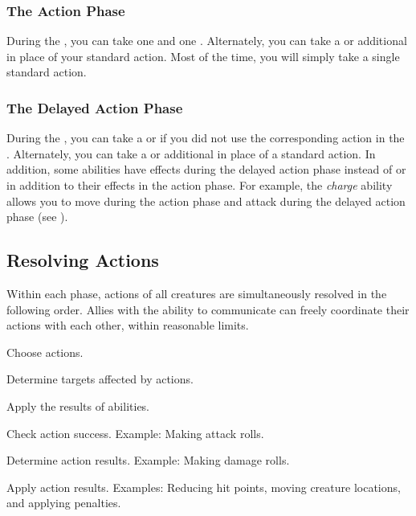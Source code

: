         \subsubsection{The Action Phase}\label{The Action Phase}
            During the , you can take one  and one .
            Alternately, you can take a  or additional  in place of your standard action.
            Most of the time, you will simply take a single standard action.

        \subsubsection{The Delayed Action Phase}\label{The Delayed Action Phase}
            During the , you can take a  or  if you did not use the corresponding action in the .
            Alternately, you can take a  or additional  in place of a standard action.
            In addition, some abilities have effects during the delayed action phase instead of or in addition to their effects in the action phase.
            For example, the \textit{charge} ability allows you to move during the action phase and attack during the delayed action phase (see ).

    \subsection{Resolving Actions}\label{Resolving Actions}

        Within each phase, actions of all creatures are simultaneously resolved in the following order.
        Allies with the ability to communicate can freely coordinate their actions with each other, within reasonable limits.

        \begin{enumerate*}
            \item Choose actions.
            \item Determine targets affected by actions.
            \item Apply the results of  abilities.
            \item Check action success.
                Example: Making attack rolls.
            \item Determine action results.
                Example: Making damage rolls.
            \item Apply action results.
                Examples: Reducing hit points, moving creature locations, and applying penalties.
        \end{enumerate*}

